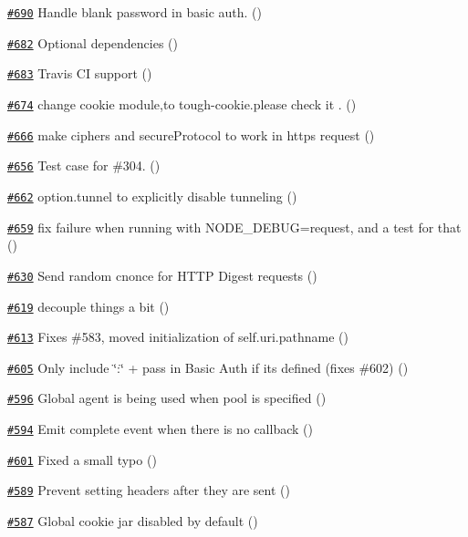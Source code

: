 \begin{DoxyItemize}
\item \href{https://github.com/request/request/pull/690}{\tt \#690} Handle blank password in basic auth. ()
\item \href{https://github.com/request/request/pull/682}{\tt \#682} Optional dependencies ()
\item \href{https://github.com/request/request/pull/683}{\tt \#683} Travis CI support ()
\item \href{https://github.com/request/request/pull/674}{\tt \#674} change cookie module,to tough-\/cookie.\+please check it . ()
\item \href{https://github.com/request/request/pull/666}{\tt \#666} make {\ttfamily ciphers} and {\ttfamily secure\+Protocol} to work in https request ()
\item \href{https://github.com/request/request/pull/656}{\tt \#656} Test case for \#304. ()
\item \href{https://github.com/request/request/pull/662}{\tt \#662} option.\+tunnel to explicitly disable tunneling ()
\item \href{https://github.com/request/request/pull/659}{\tt \#659} fix failure when running with N\+O\+D\+E\+\_\+\+D\+E\+B\+UG=request, and a test for that ()
\item \href{https://github.com/request/request/pull/630}{\tt \#630} Send random cnonce for H\+T\+TP Digest requests ()
\item \href{https://github.com/request/request/pull/619}{\tt \#619} decouple things a bit ()
\item \href{https://github.com/request/request/pull/613}{\tt \#613} Fixes \#583, moved initialization of self.\+uri.\+pathname ()
\item \href{https://github.com/request/request/pull/605}{\tt \#605} Only include \char`\"{}\+:\char`\"{} + pass in Basic Auth if it\textquotesingle{}s defined (fixes \#602) ()
\item \href{https://github.com/request/request/pull/596}{\tt \#596} Global agent is being used when pool is specified ()
\item \href{https://github.com/request/request/pull/594}{\tt \#594} Emit complete event when there is no callback ()
\item \href{https://github.com/request/request/pull/601}{\tt \#601} Fixed a small typo ()
\item \href{https://github.com/request/request/pull/589}{\tt \#589} Prevent setting headers after they are sent ()
\item \href{https://github.com/request/request/pull/587}{\tt \#587} Global cookie jar disabled by default ()

\end{DoxyItemize}

